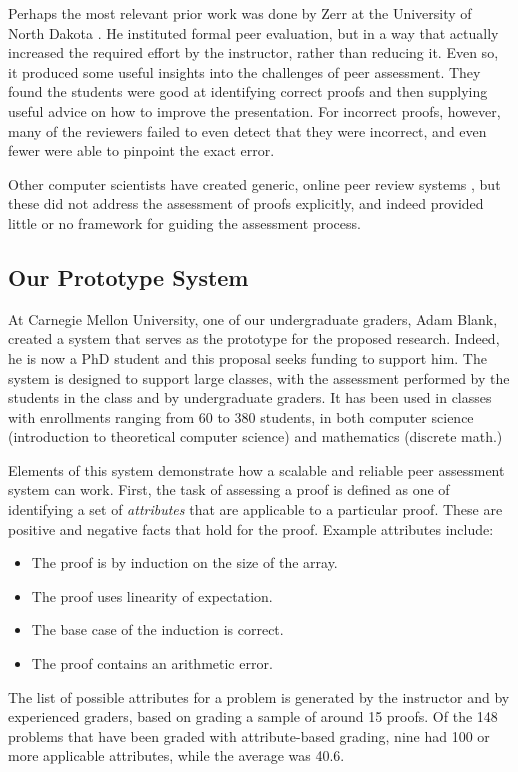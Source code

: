 \documentclass[12pt]{article}
\begin{document}
Perhaps the most relevant prior work was done by Zerr at the
University of North Dakota \citep{zerr-primus11}.
He instituted formal peer evaluation, but
in a way that actually increased the required effort by the
instructor, rather than reducing it.  Even so, it produced some
useful insights into the challenges of peer assessment.  They found
the students were good at identifying correct proofs and then
supplying useful advice on how to improve the presentation.  For
incorrect proofs, however, many of the reviewers failed to even detect
that they were incorrect, and even fewer were able to pinpoint the exact error.

Other computer scientists have created generic, online peer review systems
\citep{gehringer-sigcse05, wolfe-ite04}, but these did not address the
assessment of proofs explicitly, and indeed provided little or no
framework for guiding the assessment process.

\subsection{Our Prototype System}

At Carnegie Mellon University, one of our undergraduate graders, Adam
Blank, created a system that serves as the prototype for the proposed
research.  Indeed, he is now a PhD student and this proposal seeks
funding to support him.  The system is designed to support large classes,
with the assessment performed by the students in the class and by
undergraduate graders.  It has been used in classes with enrollments
ranging from 60 to 380 students, in both computer science (introduction
to theoretical computer science) and mathematics (discrete math.)

Elements of this system demonstrate 
how a scalable and reliable peer assessment system can work.  First,
the task of assessing a proof is defined as one of identifying a set of
{\em attributes} that are applicable to a particular proof.  These are
positive and negative facts that hold for the proof.  Example
attributes include:
\begin{itemize}
\item The proof is by induction on the size of the array.
\item The proof uses linearity of expectation.
\item The base case of the induction is correct.
\item The proof contains an arithmetic error.
\end{itemize}
The list of possible attributes for a problem is generated by the
instructor and by experienced graders, based on grading a sample of
around 15 proofs.  Of the 148 problems that have been graded with
attribute-based grading, nine had 100 or more applicable attributes,
while the average was 40.6.  
\end{document}
